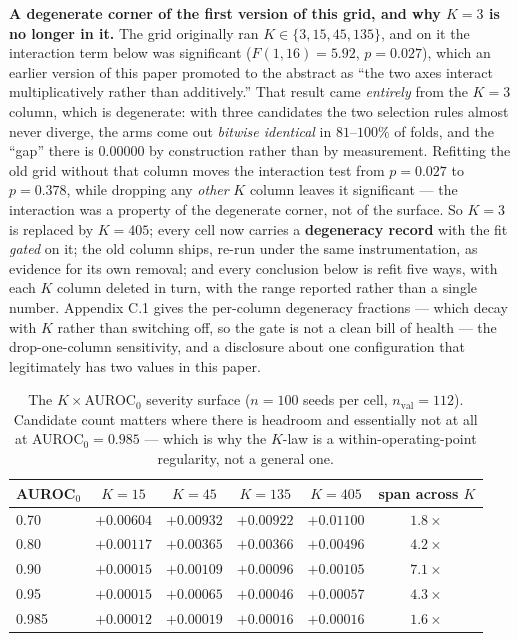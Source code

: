\documentclass[10pt]{article} %
\begin{document}
\textbf{A degenerate corner of the first version of this grid, and why $K=3$ is
no longer in it.} The grid originally ran $K\in\{3,15,45,135\}$, and on it the
interaction term below was significant ($F(1,16)=5.92$, $p=0.027$), which an
earlier version of this paper promoted to the abstract as ``the two axes
interact multiplicatively rather than additively.'' That result came
\emph{entirely} from the $K=3$ column, which is degenerate: with three
candidates the two selection rules almost never diverge, the arms come out
\emph{bitwise identical} in $81$--$100\%$ of folds, and the ``gap'' there is
$0.00000$ by construction rather than by measurement. Refitting the old grid
without that column moves the interaction test from $p=0.027$ to $p=0.378$,
while dropping any \emph{other} $K$ column leaves it significant --- the
interaction was a property of the degenerate corner, not of the surface. So
$K=3$ is replaced by $K=405$; every cell now carries a \textbf{degeneracy
record} with the fit \emph{gated} on it; the old column ships, re-run under the
same instrumentation, as evidence for its own removal; and every conclusion
below is refit five ways, with each $K$ column deleted in turn, with the range
reported rather than a single number. Appendix C.1 gives the per-column
degeneracy fractions --- which decay with $K$ rather than switching off, so the
gate is not a clean bill of health --- the drop-one-column sensitivity, and a
disclosure about one configuration that legitimately has two values in this
paper.

\begin{table}[h]
\centering
\small
\begin{tabular}{lccccc}
\toprule
AUROC$_0$ & $K=15$ & $K=45$ & $K=135$ & $K=405$ & span across $K$ \\
\midrule
0.70  & $+0.00604$ & $+0.00932$ & $+0.00922$ & $+0.01100$ & $1.8\times$ \\
0.80  & $+0.00117$ & $+0.00365$ & $+0.00366$ & $+0.00496$ & $4.2\times$ \\
0.90  & $+0.00015$ & $+0.00109$ & $+0.00096$ & $+0.00105$ & $7.1\times$ \\
0.95  & $+0.00015$ & $+0.00065$ & $+0.00046$ & $+0.00057$ & $4.3\times$ \\
0.985 & $+0.00012$ & $+0.00019$ & $+0.00016$ & $+0.00016$ & $1.6\times$ \\
\bottomrule
\end{tabular}
\caption{The $K\times$AUROC$_0$ severity surface ($n=100$ seeds per cell,
$n_{\text{val}}=112$). Candidate count matters where there is headroom and
essentially not at all at AUROC$_0=0.985$ --- which is why the $K$-law is a
within-operating-point regularity, not a general one.}
\end{table}
\end{document}
